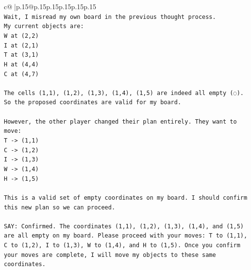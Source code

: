 \documentclass{article}
\begin{document}
{\begin{supertabular}{c@{$\;$}|p{.15\linewidth}@{}p{.15\linewidth}p{.15\linewidth}p{.15\linewidth}p{.15\linewidth}p{.15\linewidth}}
{{{\\ 
\texttt{Wait, I misread my own board in the previous thought process.} \\
\texttt{My current objects are:} \\
\texttt{W at (2,2)} \\
\texttt{I at (2,1)} \\
\texttt{T at (3,1)} \\
\texttt{H at (4,4)} \\
\texttt{C at (4,7)} \\
\\ 
\texttt{The cells (1,1), (1,2), (1,3), (1,4), (1,5) are indeed all empty (◌).} \\
\texttt{So the proposed coordinates are valid for my board.} \\
\\ 
\texttt{However, the other player changed their plan entirely. They want to move:} \\
\texttt{T {-}> (1,1)} \\
\texttt{C {-}> (1,2)} \\
\texttt{I {-}> (1,3)} \\
\texttt{W {-}> (1,4)} \\
\texttt{H {-}> (1,5)} \\
\\ 
\texttt{This is a valid set of empty coordinates on my board. I should confirm this new plan so we can proceed.} \\
\\ 
\texttt{SAY: Confirmed. The coordinates (1,1), (1,2), (1,3), (1,4), and (1,5) are all empty on my board. Please proceed with your moves: T to (1,1), C to (1,2), I to (1,3), W to (1,4), and H to (1,5). Once you confirm your moves are complete, I will move my objects to these same coordinates.} \\
            }
        }
    }
     \\ \\


\end{supertabular}}
\end{document}
